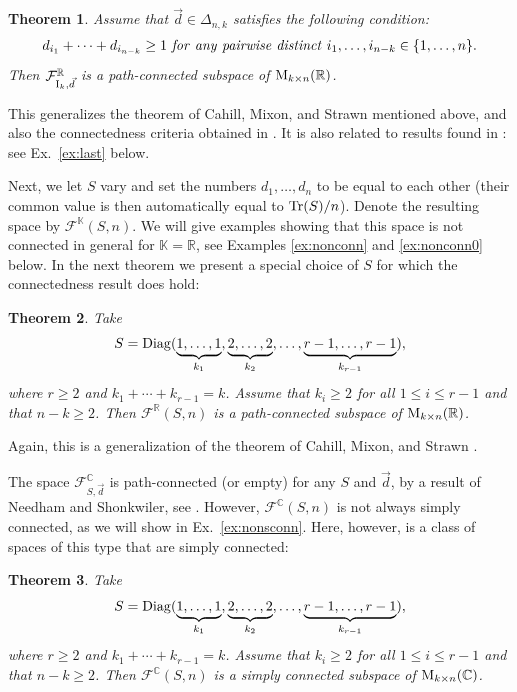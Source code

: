 \documentclass[12pt]{amsart}
\newtheorem{thm}{Theorem}[section]
\theoremstyle{definition}
\theoremstyle{remark}
\newcommand{\RR}{\mathbb R}
\newcommand{\CC}{\mathbb C}
\newcommand{\KK}{\mathbb K}
\begin{document}
\begin{thm} \label{fdn} Assume that $\vec{d}\in \Delta_{n,k}$ satisfies the following condition:
\begin{equation} \label{eqndi}d_{i_1} + \cdots + d_{i_{n-k}}\ge 1 \ {\it for \ any \ pairwise \ distinct \  }  i_1, \ldots, i_{n-k} \in \{ 1, \ldots, n\}.\end{equation} Then  ${\mathcal F}^\RR_{{\rm I}_k, \vec{d}}$ is a path-connected subspace of 
${\rm M}_{k\times n}(\RR)$.
\end{thm}

This generalizes the theorem of Cahill, Mixon, and Strawn mentioned above, and also the connectedness criteria obtained in \cite[Sect. 6]{Ma1}. It is also related to results found in \cite{CNS}: see Ex.~\ref{ex:last} below. 

Next, we let $S$ vary and set the numbers $d_1, \ldots, d_n$ to be equal to each other (their common value is then automatically equal to ${\rm Tr}(S)/n$). Denote the resulting space by ${\mathcal F}^\KK(S, n)$. We will give examples showing that this space is    not connected in general for $\KK=\RR$, see Examples \ref{ex:nonconn} and \ref{ex:nonconn0}  below. In the next theorem we present  a special choice of $S$ for which the connectedness result does hold:


\begin{thm} \label{thmconn1} Take 
$$S={\rm Diag}(\underbrace{1 , \dots, 1}_{k_1},
\underbrace{2, \dots, 2}_{k_2},
\dots,
\underbrace{{r-1}, \dots, {r-1}}_{k_{r-1}}),$$
where $r\ge 2$ and  $k_1+\cdots + k_{r-1}=k$. 
Assume that $k_i\ge 2$ for all $1\le i \le r-1$ and that $n-k\ge 2$. Then ${\mathcal F}^\RR(S, n)$ is a path-connected
  subspace of ${\rm M}_{k\times n}(\RR)$.
\end{thm}

Again, this is a generalization of the theorem of Cahill, Mixon, and Strawn \cite{CMS}.

The space ${\mathcal F}^\CC_{S, \vec{d}}$ is path-connected (or empty) for any $S$ and $\vec{d}$, by a result of 
Needham and Shonkwiler, see \cite{NS}. However, ${\mathcal F}^\CC(S, n)$ is not always simply connected, as we will show in Ex.~\ref{ex:nonsconn}. Here, however, is a class of spaces of this type that are simply connected:

\begin{thm} \label{thmconn2} Take 
$$S={\rm Diag}(\underbrace{1 , \dots, 1}_{k_1},
\underbrace{2, \dots, 2}_{k_2},
\dots,
\underbrace{{r-1}, \dots, {r-1}}_{k_{r-1}}),$$
where $r\ge 2$ and $k_1+\cdots + k_{r-1}=k$.
Assume that $k_i\ge 2$ for all $1\le i \le r-1$ and that $n-k\ge 2$. Then ${\mathcal F}^\CC(S, n)$ is a simply connected
 subspace of ${\rm M}_{k\times n}(\CC)$.
\end{thm}
\end{document}
